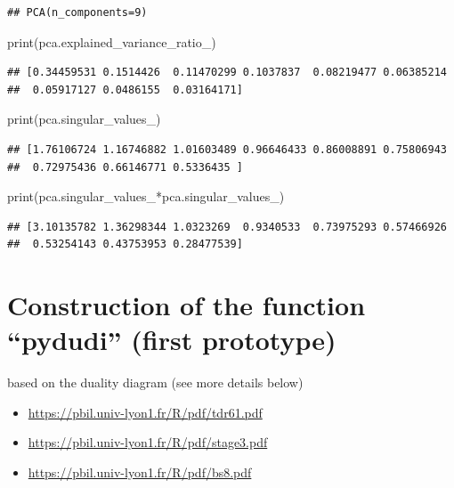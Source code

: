 \documentclass[
  10pt,
]{article}
\newenvironment{Shaded}{\begin{snugshade}}{\end{snugshade}}
\newcommand{\NormalTok}[1]{#1}
\providecommand{\tightlist}{%
  \setlength{\itemsep}{0pt}\setlength{\parskip}{0pt}}
\begin{document}
\begin{verbatim}
## PCA(n_components=9)
\end{verbatim}

\begin{Shaded}
\begin{Highlighting}[]
\NormalTok{print(pca.explained\_variance\_ratio\_)}
\end{Highlighting}
\end{Shaded}

\begin{verbatim}
## [0.34459531 0.1514426  0.11470299 0.1037837  0.08219477 0.06385214
##  0.05917127 0.0486155  0.03164171]
\end{verbatim}

\begin{Shaded}
\begin{Highlighting}[]
\NormalTok{print(pca.singular\_values\_)}
\end{Highlighting}
\end{Shaded}

\begin{verbatim}
## [1.76106724 1.16746882 1.01603489 0.96646433 0.86008891 0.75806943
##  0.72975436 0.66146771 0.5336435 ]
\end{verbatim}

\begin{Shaded}
\begin{Highlighting}[]
\NormalTok{print(pca.singular\_values\_*pca.singular\_values\_)}
\end{Highlighting}
\end{Shaded}

\begin{verbatim}
## [3.10135782 1.36298344 1.0323269  0.9340533  0.73975293 0.57466926
##  0.53254143 0.43753953 0.28477539]
\end{verbatim}

\section{Construction of the function ``pydudi'' (first
prototype)}\label{construction-of-the-function-pydudi-first-prototype}

based on the duality diagram (see more details below)

\begin{itemize}
\tightlist
\item
  \url{https://pbil.univ-lyon1.fr/R/pdf/tdr61.pdf}
\item
  \url{https://pbil.univ-lyon1.fr/R/pdf/stage3.pdf}
\item
  \url{https://pbil.univ-lyon1.fr/R/pdf/bs8.pdf}
\end{itemize}
\end{document}
